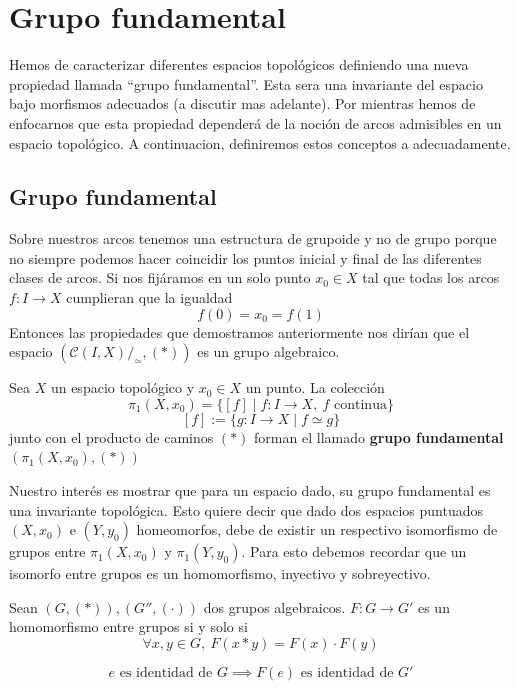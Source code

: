 \section{Grupo fundamental}
Hemos de caracterizar diferentes espacios topológicos definiendo una
nueva propiedad llamada ``grupo fundamental''. Esta sera una invariante
del espacio bajo morfismos adecuados (a discutir mas adelante). Por
mientras hemos de enfocarnos que esta propiedad dependerá de la noción
de arcos admisibles en un espacio topológico. A continuacion,
definiremos estos conceptos a adecuadamente.

{
\newcommand{\homRelAlt}{\stackrel{.}{\simeq}}



\subsection{Grupo fundamental}
Sobre nuestros arcos tenemos una estructura de grupoide y no de grupo
porque no siempre podemos hacer coincidir los puntos inicial y final de
las diferentes clases de arcos. Si nos fijáramos en un solo punto \(x_0
\in X\) tal que todas los arcos \(f : I \to X\) cumplieran que la igualdad
\[ f(0) = x_0 = f (1) \]
Entonces las propiedades que demostramos anteriormente nos dirían que el
espacio \((\mathcal C \left( I , X \right) / _\simeq , \left( *
\right))\) es un grupo algebraico.
\begin{definicion}
  Sea \(X\) un espacio topológico y \(x_0 \in X\) un punto. La colección
  \[ \pi_1 (X,x_0) = \{ [f] \mid f : I \to X,\ f \text{ continua}\}\]
  \[ [f] := \{ g : I \to X \mid f \simeq g\}\]
  junto con el producto de caminos \((*)\) forman el llamado
  \textbf{grupo fundamental} \((\pi_1(X,x_0), (*))\)
\end{definicion}

Nuestro interés es mostrar que para un espacio dado, su grupo
fundamental es una invariante topológica. Esto quiere decir que dado dos
espacios puntuados \((X,x_0)\) e \((Y,y_0)\) homeomorfos, debe de
existir un respectivo isomorfismo de grupos entre \(\pi_1(X,x_0)\) y
\(\pi_1(Y,y_0)\). Para esto debemos recordar que un isomorfo entre
grupos es un homomorfismo, inyectivo y sobreyectivo.
\begin{definicion}
  Sean \((G,(*)), (G'', (\cdot))\) dos grupos algebraicos. \(F : G \to
  G'\) es un homomorfismo entre grupos si y solo si
  \[ \forall x,y \in G,\ F (x * y) = F(x) \cdot F(y)\]
\end{definicion}
\begin{corolario}
  \[ e \text{ es identidad de } G \implies F(e) \text { es identidad de } G' \]
\end{corolario}

}
